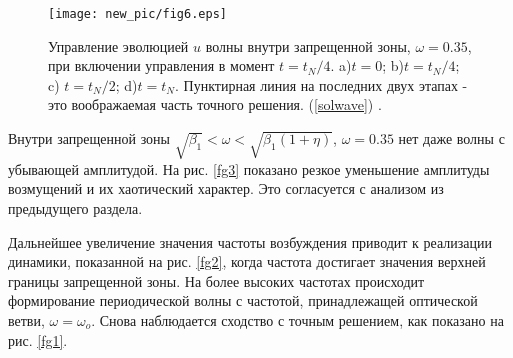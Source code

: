  \begin{figure*}[ht]
\begin{center}
\texttt{[image: new\_pic/fig6.eps]}
\end{center}
\caption{Управление эволюцией $ u $ волны внутри запрещенной зоны, $\omega=0.35$, при включении управления в момент $t=t_N/4$. a)$t=0$; b)$ t=t_N/4$; c) $t=t_N/2$; d)$t=t_N$. Пунктирная линия на последних двух этапах - это воображаемая часть точного решения. (\ref{solwave}) .}
\label{fg6}
 \end{figure*}
Внутри запрещенной зоны $ \sqrt {\beta_1} <\omega <\sqrt {\beta_1 (1+ \eta)} $, $ \omega = 0.35 $ нет даже волны с убывающей амплитудой. На рис. \ref{fg3} показано резкое уменьшение амплитуды возмущений и их хаотический характер. Это согласуется с анализом из предыдущего раздела.


Дальнейшее увеличение значения частоты возбуждения приводит к реализации динамики, показанной на рис. \ref {fg2}, когда частота достигает значения верхней границы запрещенной зоны. На более высоких частотах происходит формирование периодической волны с частотой, принадлежащей оптической ветви, $ \omega = \omega_o $. Снова наблюдается сходство с точным решением, как показано на рис. \ref {fg1}.

  
